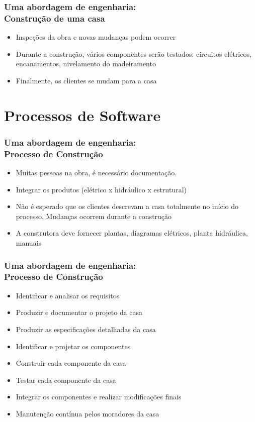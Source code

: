 \begin{frame}
\frametitle{Uma abordagem de engenharia:\\
Construção de uma casa}
\begin{itemize}
 \item Inspeções da obra e novas mudanças
podem ocorrer
\item Durante a construção, vários componentes
serão testados: circuitos elétricos,
encanamentos, nivelamento do
madeiramento
\item Finalmente, os clientes se mudam para a
casa
\end{itemize}
\end{frame}

\section{Processos de Software}
\begin{frame}
\frametitle{Uma abordagem de engenharia:\\
Processo de Construção}
\begin{itemize}
 \item Muitas pessoas na obra, é necessário documentação.
\item Integrar os produtos (elétrico x hidráulico x estrutural)

\item Não é esperado que os clientes descrevam a
casa totalmente no início do processo. Mudanças ocorrem durante a construção

\item A construtora deve fornecer plantas, diagramas elétricos, planta hidráulica, manuais
\end{itemize}
\end{frame}

\begin{frame}
\frametitle{Uma abordagem de engenharia:\\
Processo de Construção}
\begin{itemize}
\item Identificar e analisar os requisitos
\item Produzir e documentar o projeto da casa
\item Produzir as especificações detalhadas da casa
\item Identificar e projetar os componentes
\item Construir cada componente da casa
\item Testar cada componente da casa
\item Integrar os componentes e realizar modificações finais
\item Manutenção contínua pelos moradores da casa
\end{itemize}
\end{frame}



